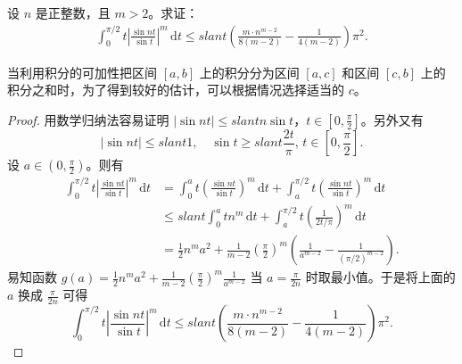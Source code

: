 \documentclass[../../main.tex]{subfiles}
\begin{document}
\begin{example}
设 \( n \) 是正整数，且 \( m > 2 \)。求证：
\begin{align*}
\int_{0}^{\pi/2} t \left| \frac{\sin nt}{\sin t} \right|^m \, \mathrm{d}t \leqslant slant \left( \frac{m \cdot n^{m - 2}}{8(m - 2)} - \frac{1}{4(m - 2)} \right) \pi^2.
\end{align*}
\end{example}
\begin{remark}
当利用积分的可加性把区间 \( [a, b] \) 上的积分分为区间 \( [a, c] \) 和区间 \( [c, b] \) 上的积分之和时，为了得到较好的估计，可以根据情况选择适当的 \( c \)。
\end{remark}
\begin{proof}
用数学归纳法容易证明 \( |\sin nt| \leqslant slant n \sin t \)，\( t \in \left[ 0, \frac{\pi}{2} \right] \)。另外又有
\[
|\sin nt| \leqslant slant 1, \quad \sin t \geqslant slant \frac{2t}{\pi}, \, t \in \left[ 0, \frac{\pi}{2} \right].
\]
设 \( a \in \left( 0, \frac{\pi}{2} \right) \)。则有
\begin{align*}
\int_{0}^{\pi/2} t \left| \frac{\sin nt}{\sin t} \right|^m \, \mathrm{d}t &= \int_{0}^{a} t \left( \frac{\sin nt}{\sin t} \right)^m \, \mathrm{d}t + \int_{a}^{\pi/2} t \left( \frac{\sin nt}{\sin t} \right)^m \, \mathrm{d}t \\
&\leqslant slant \int_{0}^{a} tn^m \, \mathrm{d}t + \int_{a}^{\pi/2} t \left( \frac{1}{2t/\pi} \right)^m \, \mathrm{d}t \\
&= \frac{1}{2} n^m a^2 + \frac{1}{m - 2} \left( \frac{\pi}{2} \right)^m \left( \frac{1}{a^{m - 2}} - \frac{1}{(\pi/2)^{m - 2}} \right).
\end{align*}
易知函数 \( g(a) = \frac{1}{2} n^m a^2 + \frac{1}{m - 2} \left( \frac{\pi}{2} \right)^m \frac{1}{a^{m - 2}} \) 当 \( a = \frac{\pi}{2n} \) 时取最小值。于是将上面的 \( a \) 换成 \( \frac{\pi}{2n} \) 可得
\[
\int_{0}^{\pi/2} t \left| \frac{\sin nt}{\sin t} \right|^m \, \mathrm{d}t \leqslant slant \left( \frac{m \cdot n^{m - 2}}{8(m - 2)} - \frac{1}{4(m - 2)} \right) \pi^2.
\]
\end{proof}
\end{document}
